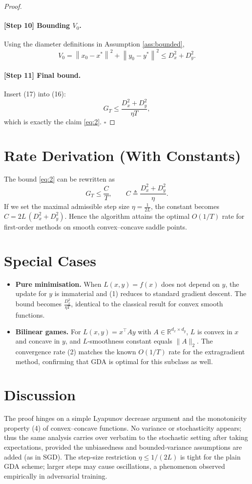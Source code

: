 \documentclass{article}
\newcommand{\R}{\mathbb{R}}
\newcommand{\norm}[1]{\left\|#1\right\|}
\begin{document}
\begin{proof}
\paragraph{[Step 10] Bounding $V_0$.}
Using the diameter definitions in Assumption \ref{ass:bounded},
\[
V_0=\norm{x_0-x^*}^2+\norm{y_0-y^*}^2\le D_x^2+D_y^2 .
\tag{17}
\]

\paragraph{[Step 11] Final bound.}
Insert (17) into (16):
\[
G_T\le \frac{D_x^2+D_y^2}{\eta T},
\]
which is exactly the claim \eqref{eq:2}. $\square$
\end{proof}

\section*{Rate Derivation (With Constants)}
The bound \eqref{eq:2} can be rewritten as
\[
G_T\le \frac{C}{T},\qquad C\triangleq\frac{D_x^2+D_y^2}{\eta}.
\]
If we set the maximal admissible step size $\eta=\frac{1}{2L}$, the constant becomes $C=2L\,(D_x^2+D_y^2)$. Hence the algorithm attains the optimal $O(1/T)$ rate for first‑order methods on smooth convex–concave saddle points.

\section*{Special Cases}
\begin{itemize}
\item \textbf{Pure minimisation.} When $L(x,y)=f(x)$ does not depend on $y$, the update for $y$ is immaterial and (1) reduces to standard gradient descent. The bound becomes $\frac{D_x^2}{\eta T}$, identical to the classical result for convex smooth functions.
\item \textbf{Bilinear games.} For $L(x,y)=x^\top A y$ with $A\in\R^{d_x\times d_y}$, $L$ is convex in $x$ and concave in $y$, and $L$‑smoothness constant equals $\|A\|_2$. The convergence rate (2) matches the known $O(1/T)$ rate for the extragradient method, confirming that GDA is optimal for this subclass as well.
\end{itemize}

\section*{Discussion}
The proof hinges on a simple Lyapunov decrease argument and the monotonicity property (4) of convex–concave functions. No variance or stochasticity appears; thus the same analysis carries over verbatim to the stochastic setting after taking expectations, provided the unbiasedness and bounded‑variance assumptions are added (as in SGD). The step‑size restriction $\eta\le 1/(2L)$ is tight for the plain GDA scheme; larger steps may cause oscillations, a phenomenon observed empirically in adversarial training.
\end{document}
